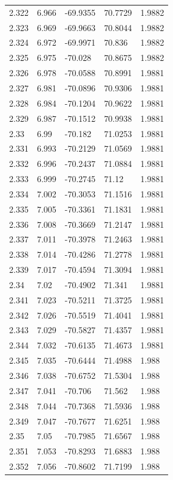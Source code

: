 \begin{tabular}{lllll}
2.322 & 6.966 & -69.9355 & 70.7729 & 1.9882 \\
2.323 & 6.969 & -69.9663 & 70.8044 & 1.9882 \\
2.324 & 6.972 & -69.9971 & 70.836 & 1.9882 \\
2.325 & 6.975 & -70.028 & 70.8675 & 1.9882 \\
2.326 & 6.978 & -70.0588 & 70.8991 & 1.9881 \\
2.327 & 6.981 & -70.0896 & 70.9306 & 1.9881 \\
2.328 & 6.984 & -70.1204 & 70.9622 & 1.9881 \\
2.329 & 6.987 & -70.1512 & 70.9938 & 1.9881 \\
2.33 & 6.99 & -70.182 & 71.0253 & 1.9881 \\
2.331 & 6.993 & -70.2129 & 71.0569 & 1.9881 \\
2.332 & 6.996 & -70.2437 & 71.0884 & 1.9881 \\
2.333 & 6.999 & -70.2745 & 71.12 & 1.9881 \\
2.334 & 7.002 & -70.3053 & 71.1516 & 1.9881 \\
2.335 & 7.005 & -70.3361 & 71.1831 & 1.9881 \\
2.336 & 7.008 & -70.3669 & 71.2147 & 1.9881 \\
2.337 & 7.011 & -70.3978 & 71.2463 & 1.9881 \\
2.338 & 7.014 & -70.4286 & 71.2778 & 1.9881 \\
2.339 & 7.017 & -70.4594 & 71.3094 & 1.9881 \\
2.34 & 7.02 & -70.4902 & 71.341 & 1.9881 \\
2.341 & 7.023 & -70.5211 & 71.3725 & 1.9881 \\
2.342 & 7.026 & -70.5519 & 71.4041 & 1.9881 \\
2.343 & 7.029 & -70.5827 & 71.4357 & 1.9881 \\
2.344 & 7.032 & -70.6135 & 71.4673 & 1.9881 \\
2.345 & 7.035 & -70.6444 & 71.4988 & 1.988 \\
2.346 & 7.038 & -70.6752 & 71.5304 & 1.988 \\
2.347 & 7.041 & -70.706 & 71.562 & 1.988 \\
2.348 & 7.044 & -70.7368 & 71.5936 & 1.988 \\
2.349 & 7.047 & -70.7677 & 71.6251 & 1.988 \\
2.35 & 7.05 & -70.7985 & 71.6567 & 1.988 \\
2.351 & 7.053 & -70.8293 & 71.6883 & 1.988 \\
2.352 & 7.056 & -70.8602 & 71.7199 & 1.988 \\

\end{tabular}

